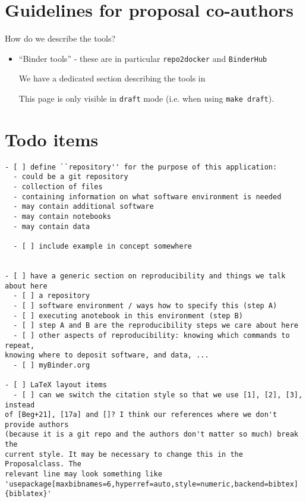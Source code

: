\documentclass[
  deliverables,
  longtasklabels,
  noworkareas,
  svgnames,
  \classoptions
]{euproposal}       %
\newcommand{\softwarename}[1]{\texttt{#1}}
\newcommand{\repotodocker}{\softwarename{repo2docker}}
\newcommand{\binderhub}{\softwarename{BinderHub}}
\begin{document}
\begin{draft}


\section*{Guidelines for proposal co-authors}

How do we describe the tools?
\begin{itemize}
\item  ``Binder tools'' - these are in particular \repotodocker{} and
  \binderhub{}

  We have a dedicated section describing the tools in 

  \vfill This page is only visible in \texttt{draft} mode (i.e. when using
  \texttt{make draft}).
  
\end{itemize}

\section*{Todo items}

\begin{verbatim}
- [ ] define ``repository'' for the purpose of this application:
  - could be a git repository
  - collection of files
  - containing information on what software environment is needed
  - may contain additional software
  - may contain notebooks
  - may contain data

  - [ ] include example in concept somewhere


- [ ] have a generic section on reproducibility and things we talk about here
  - [ ] a repository
  - [ ] software environment / ways how to specify this (step A)
  - [ ] executing anotebook in this environment (step B)
  - [ ] step A and B are the reproducibility steps we care about here
  - [ ] other aspects of reproducibility: knowing which commands to repeat,
knowing where to deposit software, and data, ...
  - [ ] myBinder.org

- [ ] LaTeX layout items
  - [ ] can we switch the citation style so that we use [1], [2], [3], instead
of [Beg+21], [17a] and []? I think our references where we don't provide authors
(because it is a git repo and the authors don't matter so much) break the
current style. It may be necessary to change this in the Proposalclass. The
relevant line may look something like 'usepackage[maxbibnames=6,hyperref=auto,style=numeric,backend=bibtex]{biblatex}'

\end{verbatim}
  
\end{draft}
\clearpage
\end{document}
